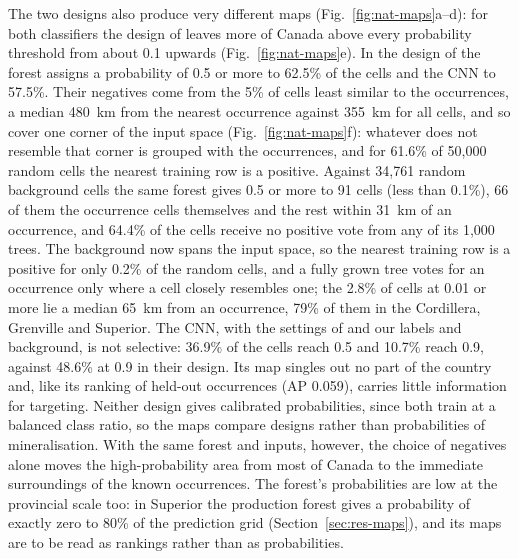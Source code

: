 \documentclass[pdflatex,sn-apa]{sn-jnl}
\begin{document}
The two designs also produce very different maps (Fig.~\ref{fig:nat-maps}a--d): for both classifiers the design of \citet{Parsa2024} leaves more of Canada above every probability threshold from about 0.1 upwards (Fig.~\ref{fig:nat-maps}e). In the design of \citet{Parsa2024} the forest assigns a probability of 0.5 or more to 62.5\% of the cells and the CNN to 57.5\%. Their negatives come from the 5\% of cells least similar to the occurrences, a median 480~km from the nearest occurrence against 355~km for all cells, and so cover one corner of the input space (Fig.~\ref{fig:nat-maps}f): whatever does not resemble that corner is grouped with the occurrences, and for 61.6\% of 50,000 random cells the nearest training row is a positive. Against 34,761 random background cells the same forest gives 0.5 or more to 91 cells (less than 0.1\%), 66 of them the occurrence cells themselves and the rest within 31~km of an occurrence, and 64.4\% of the cells receive no positive vote from any of its 1,000 trees. The background now spans the input space, so the nearest training row is a positive for only 0.2\% of the random cells, and a fully grown tree votes for an occurrence only where a cell closely resembles one; the 2.8\% of cells at 0.01 or more lie a median 65~km from an occurrence, 79\% of them in the Cordillera, Grenville and Superior. The CNN, with the settings of \citet{Parsa2024} and our labels and background, is not selective: 36.9\% of the cells reach 0.5 and 10.7\% reach 0.9, against 48.6\% at 0.9 in their design. Its map singles out no part of the country and, like its ranking of held-out occurrences (AP 0.059), carries little information for targeting. Neither design gives calibrated probabilities, since both train at a balanced class ratio, so the maps compare designs rather than probabilities of mineralisation. With the same forest and inputs, however, the choice of negatives alone moves the high-probability area from most of Canada to the immediate surroundings of the known occurrences. The forest's probabilities are low at the provincial scale too: in Superior the production forest gives a probability of exactly zero to 80\% of the prediction grid (Section~\ref{sec:res-maps}), and its maps are to be read as rankings rather than as probabilities.
\end{document}
